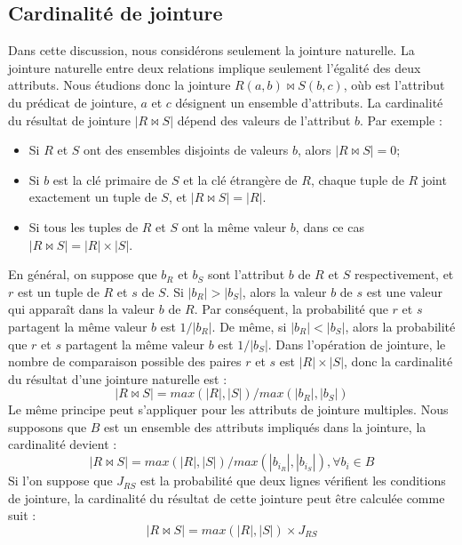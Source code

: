 \subsection{Cardinalité de jointure}
Dans cette discussion, nous considérons seulement la jointure naturelle. La jointure naturelle entre deux relations implique seulement l'égalité des deux attributs. Nous étudions donc la jointure $R(a, b) \bowtie S(b, c)$, où$ $b est l'attribut du prédicat de jointure, $a$ et $c$ désignent un ensemble d'attributs. La cardinalité du résultat de jointure $|R \bowtie S|$ dépend des valeurs de l'attribut $b$. Par exemple :
\begin{itemize}
 \item Si $R$ et $S$ ont des ensembles disjoints de valeurs $b$, alors $|R \bowtie S| = 0$;
 \item Si $b$ est la clé primaire de $S$ et la clé étrangère de $R$, chaque tuple de $R$ joint exactement un tuple de $S$, et $|R \bowtie S| = |R|$.
 \item Si tous les tuples de $R$ et $S$ ont la même valeur $b$, dans ce cas $|R \bowtie S| = |R| \times |S|$.
\end{itemize}
En général, on suppose que $b_R$ et $b_S$ sont l'attribut $b$ de $R$ et $S$ respectivement, et $r$ est un tuple de $R$ et $s$ de $S$. Si $|b_R| > |b_S|$, alors la valeur $b$ de $s$ est une valeur qui apparaît dans la valeur $b$ de $R$. Par conséquent, la probabilité que $r$ et $s$ partagent la même valeur $b$ est $1 / |b_R|$. De même, si $|b_R | < |b_S|$, alors la probabilité que $r$ et $s$ partagent la même valeur $b$ est $1 / |b_S|$. Dans l'opération de jointure, le nombre de comparaison possible des paires $r$ et $s$ est $|R| \times |S|$, donc la cardinalité du résultat d'une jointure naturelle est :
\begin{equation}
 |R \bowtie S| = max(|R|, |S|) / max(|b_R|, |b_S|)
\end{equation}
Le même principe peut s'appliquer pour les attributs de jointure multiples. Nous supposons que $B$ est un ensemble des attributs impliqués dans la jointure, la cardinalité devient :
\begin{equation}
 |R \bowtie S| = max(|R|, |S|) / max(|b_{i_R}|, |b_{i_S}|), \forall b_i \in B
\end{equation}
Si l'on suppose que $J_{RS}$ est la probabilité que deux lignes vérifient les conditions de jointure, la cardinalité du résultat de cette jointure peut être calculée comme suit :
\begin{equation}
 |R \bowtie S| = max(|R|, |S|) \times J_{RS}
\end{equation}


